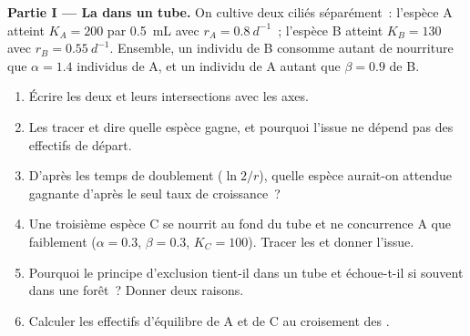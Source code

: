 \begin{problem}
\label{pb:b1:species-interactions:1}

\medskip
\noindent\textbf{Partie I --- La  dans un tube.}
On cultive deux ciliés séparément~: l'espèce A atteint $K_A = 200$ par
\qty{0.5}{mL} avec $r_A = \qty{0.8}{d^{-1}}$~; l'espèce B atteint
$K_B = 130$ avec $r_B = \qty{0.55}{d^{-1}}$. Ensemble, un individu
de B consomme autant de nourriture que $\alpha = 1.4$ individus de A, et
un individu de A autant que $\beta = 0.9$ de B.
\begin{enumerate}
  \item Écrire les deux  et leurs intersections avec les axes.
  \item Les tracer et dire quelle espèce gagne, et pourquoi l'issue ne
        dépend pas des effectifs de départ.
  \item D'après les temps de doublement ($\ln 2/r$), quelle espèce
        aurait-on attendue gagnante d'après le seul taux de croissance~?
  \item Une troisième espèce C se nourrit au fond du tube et ne
        concurrence A que faiblement ($\alpha = 0.3$, $\beta = 0.3$, $K_C = 100$).
        Tracer les  et donner l'issue.
  \item Pourquoi le principe d'exclusion tient-il dans un tube et
        échoue-t-il si souvent dans une forêt~? Donner deux raisons.
  \item Calculer les effectifs d'équilibre de A et de C au croisement
        des .
\end{enumerate}


\end{problem}
